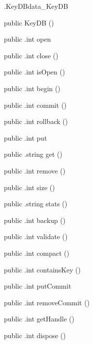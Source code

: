 \begin{CrexxClass}{.KeyDB}{data\_KeyDB}

  \begin{Hierarchy}
  \end{Hierarchy}

  \begin{Members}

    \Factory
      {public}
      {KeyDB}
      {()}

    \Method
      {public}
      {.int}
      {open}
      {}

    \Method
      {public}
      {.int}
      {close}
      {()}

    \Method
      {public}
      {.int}
      {isOpen}
      {()}

    \Method
      {public}
      {.int}
      {begin}
      {()}

    \Method
      {public}
      {.int}
      {commit}
      {()}

    \Method
      {public}
      {.int}
      {rollback}
      {()}

    \Method
      {public}
      {.int}
      {put}
      {}

    \Method
      {public}
      {.string}
      {get}
      {()}

    \Method
      {public}
      {.int}
      {remove}
      {()}

    \Method
      {public}
      {.int}
      {size}
      {()}

    \Method
      {public}
      {.string}
      {stats}
      {()}

    \Method
      {public}
      {.int}
      {backup}
      {()}

    \Method
      {public}
      {.int}
      {validate}
      {()}

    \Method
      {public}
      {.int}
      {compact}
      {()}

    \Method
      {public}
      {.int}
      {containsKey}
      {()}

    \Method
      {public}
      {.int}
      {putCommit}
      {}

    \Method
      {public}
      {.int}
      {removeCommit}
      {()}

    \Method
      {public}
      {.int}
      {getHandle}
      {()}

    \Method
      {public}
      {.int}
      {dispose}
      {()}

  \end{Members}
\end{CrexxClass}


